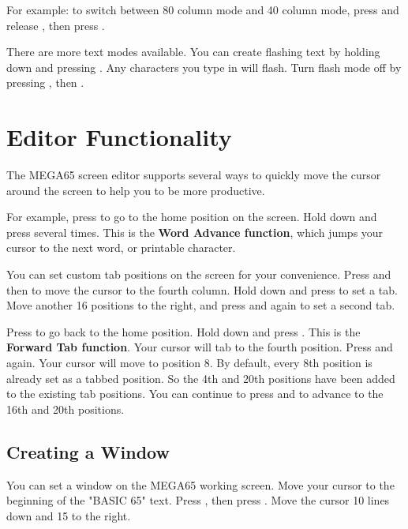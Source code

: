 For example: to switch between 80 column mode and 40 column mode, press and release , then press .

There are more text modes available. You can create flashing text by holding  down and pressing . Any characters you type in will flash. Turn flash mode off by pressing , then .


\section{Editor Functionality}

The MEGA65 screen editor supports several ways to quickly move the cursor around the screen to help you to be more productive.

For example, press  to go to the home position on the screen. Hold  down and press  several times. This is the \textbf{Word Advance function}, which jumps your cursor to the next word, or printable character.

You can set custom tab positions on the screen for your convenience. Press  and then \megakey{$\rightarrow$} to move the cursor to the fourth column. Hold down  and press  to set a tab. Move another 16 positions to the right, and press  and  again to set a second tab.

Press  to go back to the home position. Hold  down and press . This is the \textbf{Forward Tab function}. Your cursor will tab to the fourth position. Press  and  again. Your cursor will move to position 8. By default, every 8th position is already set as a tabbed position. So the 4th and 20th positions have been added to the existing tab positions. You can continue to press  and  to advance to the 16th and 20th positions.

\subsection{Creating a Window}

You can set a window on the MEGA65 working screen. Move your cursor to the beginning of the "BASIC 65" text. Press , then press . Move the cursor 10 lines down and 15 to the right.

